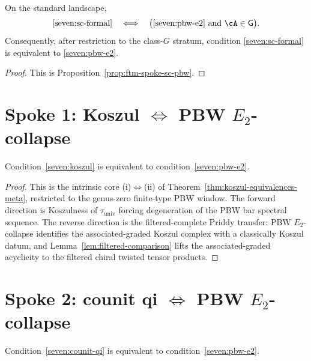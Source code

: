 \begin{corollary}
\label{cor:ftm-seventh-class-G}
On the standard landscape,
\[
\ref{seven:sc-formal}
\quad\Longleftrightarrow\quad
\bigl(\ref{seven:pbw-e2}\ \text{and}\ \cA\in\mathsf{G}\bigr).
\]
Consequently, after restriction to the class-$G$ stratum, condition
\ref{seven:sc-formal} is equivalent to \ref{seven:pbw-e2}.
\end{corollary}

\begin{proof}
This is Proposition~\ref{prop:ftm-spoke-sc-pbw}.
\end{proof}

\section{Spoke 1: Koszul \texorpdfstring{$\Leftrightarrow$}{iff} PBW
$E_2$-collapse}
\label{sec:ftm-spoke-1}

\begin{proposition}
\label{prop:ftm-spoke-koszul-pbw}
Condition~\ref{seven:koszul} is equivalent to
condition~\ref{seven:pbw-e2}.
\end{proposition}

\begin{proof}
This is the intrinsic core
\textup{(i)}$\Leftrightarrow$\textup{(ii)} of
Theorem~\ref{thm:koszul-equivalences-meta}, restricted to the
genus-zero finite-type PBW window.  The forward direction is
Koszulness of $\tau_{\mathrm{univ}}$ forcing degeneration of the
PBW bar spectral sequence.  The reverse direction is the
filtered-complete Priddy transfer: PBW $E_2$-collapse identifies the
associated-graded Koszul complex with a classically Koszul datum, and
Lemma~\ref{lem:filtered-comparison} lifts the associated-graded
acyclicity to the filtered chiral twisted tensor products.
\end{proof}

\section{Spoke 2: counit qi \texorpdfstring{$\Leftrightarrow$}{iff}
PBW $E_2$-collapse}
\label{sec:ftm-spoke-2}

\begin{proposition}
\label{prop:ftm-spoke-counit-pbw}
Condition~\ref{seven:counit-qi} is equivalent to
condition~\ref{seven:pbw-e2}.
\end{proposition}


